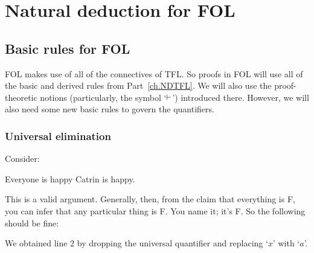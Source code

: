 \part{Natural deduction for FOL}
\label{ch.NDFOL}


\chapter{Basic rules for FOL}\label{s:BasicFOL}

FOL makes use of all of the connectives of TFL. So proofs in FOL will use all of the basic and derived rules from Part~\ref{ch.NDTFL}. We will also use the proof-theoretic notions (particularly, the symbol `$\vdash$') introduced there. However, we will also need some new basic rules to govern the quantifiers.


\section{Universal elimination}Consider:
\begin{earg}
\prem Everyone is happy
\conc Catrin is happy.
\end{earg} This is a valid argument. Generally, then, from the claim that everything is F, you can infer that any particular thing is F. You name it; it's F. So the following should be fine:
\begin{pf}
	 
\end{pf}
We obtained line 2 by dropping the universal quantifier and replacing `$x$' with `$a$'.

